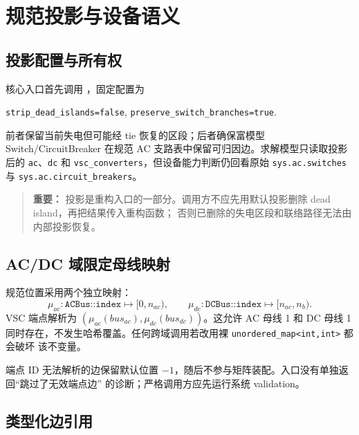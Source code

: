 
\section{规范投影与设备语义}\label{sec:nr-projection}

\subsection{投影配置与所有权}

核心入口首先调用
，固定配置为
\begin{center}
\texttt{strip\_dead\_islands=false},\qquad
\texttt{preserve\_switch\_branches=true}.
\end{center}
前者保留当前失电但可能经 tie 恢复的区段；后者确保富模型 Switch/CircuitBreaker 在规范 AC
支路表中保留可归因边。求解模型只读取投影后的 \texttt{ac}、\texttt{dc} 和
\texttt{vsc\_converters}，但设备能力判断仍回看原始 \texttt{sys.ac.switches} 与
\texttt{sys.ac.circuit\_breakers}。

\begin{quote}\small\textbf{重要：}
投影是重构入口的一部分。调用方不应先用默认投影删除 dead island，再把结果传入重构函数；
否则已删除的失电区段和联络路径无法由内部投影恢复。
\end{quote}

\subsection{AC/DC 域限定母线映射}

规范位置采用两个独立映射：
\begin{equation}
\mu_{ac}:\texttt{ACBus::index}\mapsto[0,n_{ac}),\qquad
\mu_{dc}:\texttt{DCBus::index}\mapsto[n_{ac},n_b).
\end{equation}
VSC 端点解析为 $(\mu_{ac}(bus_{ac}),\mu_{dc}(bus_{dc}))$。这允许 AC 母线 1 和 DC 母线 1
同时存在，不发生哈希覆盖。任何跨域调用若改用裸 \texttt{unordered\_map<int,int>} 都会破坏
该不变量。

端点 ID 无法解析的边保留默认位置 $-1$，随后不参与矩阵装配。入口没有单独返回“跳过了无效端点边”
的诊断；严格调用方应先运行系统 validation。

\subsection{类型化边引用}

